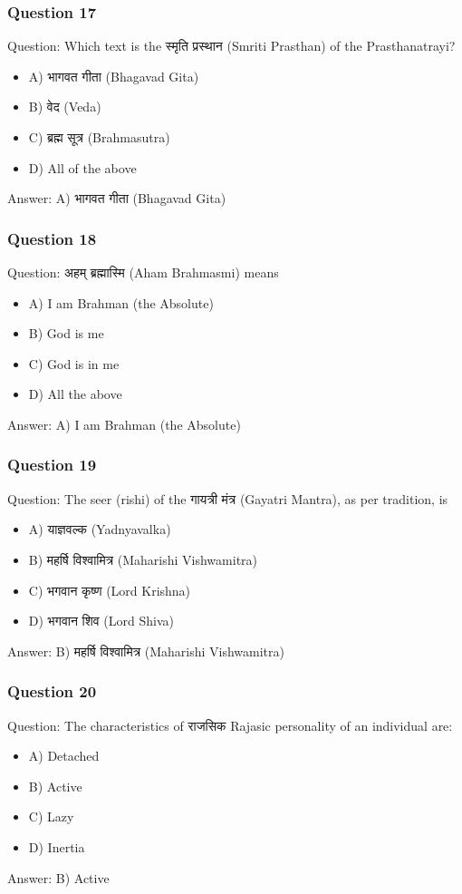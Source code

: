 \begin{frame}[fragile]\frametitle{Question 17}
Question: Which text is the स्मृति प्रस्थान (Smriti Prasthan) of the Prasthanatrayi?
\begin{itemize}
\item A) भागवत गीता (Bhagavad Gita)
\item B) वेद (Veda)
\item C) ब्रह्म सूत्र (Brahmasutra)
\item D) All of the above
\end{itemize}
Answer: A) भागवत गीता (Bhagavad Gita)
\end{frame}

\begin{frame}[fragile]\frametitle{Question 18}
Question: अहम् ब्रह्मास्मि (Aham Brahmasmi) means
\begin{itemize}
\item A) I am Brahman (the Absolute)
\item B) God is me
\item C) God is in me
\item D) All the above
\end{itemize}
Answer: A) I am Brahman (the Absolute)
\end{frame}

\begin{frame}[fragile]\frametitle{Question 19}
Question: The seer (rishi) of the गायत्री मंत्र (Gayatri Mantra), as per tradition, is
\begin{itemize}
\item A) याज्ञवल्क (Yadnyavalka)
\item B) महर्षि विश्वामित्र (Maharishi Vishwamitra)
\item C) भगवान कृष्ण (Lord Krishna)
\item D) भगवान शिव (Lord Shiva)
\end{itemize}
Answer: B) महर्षि विश्वामित्र (Maharishi Vishwamitra)
\end{frame}

\begin{frame}[fragile]\frametitle{Question 20}
Question: The characteristics of राजसिक Rajasic personality of an individual are:
\begin{itemize}
\item A) Detached
\item B) Active
\item C) Lazy
\item D) Inertia
\end{itemize}
Answer: B) Active
\end{frame}

